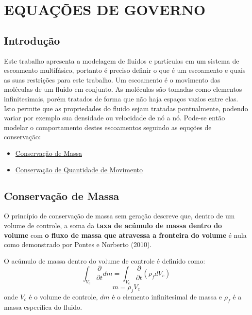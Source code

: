 \chapter{\textbf{EQUAÇÕES DE GOVERNO}}
\label{sec_eq_governo}
\section{\textbf{Introdução}}
Este trabalho apresenta a modelagem de fluidos e partículas em um sistema de escoamento multifásico, portanto é preciso definir o que é um escoamento e quais as suas restrições para este trabalho.
Um escoamento é o movimento das moléculas de um fluido em conjunto.
As moléculas são tomadas como elementos infinitesimais, porém tratados de forma que não haja espaços vazios entre elas.
Isto permite que as propriedades do fluido sejam tratadas pontualmente, podendo variar por exemplo sua densidade ou velocidade de nó a nó.
Pode-se então modelar o comportamento destes escoamentos seguindo as equções de conservação:
\begin{itemize}
	\item \hyperref[cons_massa]{Conservação de Massa}
	\item \hyperref[cons_qmov]{Conservação de Quantidade de Movimento}
\end{itemize}

\section{\textbf{Conservação de Massa}}
\label{sec_cons_massa}
O princípio de conservação de massa sem geração descreve que, dentro de um volume de controle, a soma da \textbf{taxa de acúmulo de massa dentro do volume} com \textbf{o fluxo de massa que atravessa a fronteira do volume} é nula como demonstrado por Pontes e Norberto (2010)\cite{pontes_norberto}.

O acúmulo de massa dentro do volume de controle é definido como:
\begin{equation}
    \int_{V_c}\dfrac{\partial}{\partial t} dm =  \int_{V_c}\dfrac{\partial}{\partial t} (\rho_f d V_c)
    \label{acumulo_massa}
\end{equation}
\begin{equation}
    m =  \rho_f V_c
    \label{densidade}
\end{equation}
onde $V_c$ é o volume de controle, $dm$ é o elemento infinitesimal de massa e $\rho_f$ é a massa específica do fluido.

